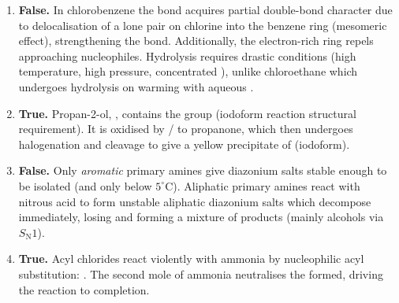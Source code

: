 \documentclass[11pt]{article}
\newcommand{\cle}[1]{{\popxbold\color{popdark}#1}}
\begin{document}
\begin{corrige}
\begin{enumerate}
\item \textbf{False.} In chlorobenzene the  bond acquires partial double-bond character due to delocalisation of a lone pair on chlorine into the benzene ring (\cle{mesomeric effect}), strengthening the bond. Additionally, the electron-rich ring repels approaching nucleophiles. Hydrolysis requires drastic conditions (high temperature, high pressure, concentrated ), unlike chloroethane which undergoes hydrolysis on warming with aqueous .
\item \textbf{True.} Propan-2-ol, , contains the  group (\cle{iodoform reaction} structural requirement). It is oxidised by / to propanone, which then undergoes halogenation and cleavage to give a yellow precipitate of  (iodoform).
\item \textbf{False.} Only \emph{aromatic} primary amines give diazonium salts stable enough to be isolated (and only below $5^{\circ}\mathrm{C}$). Aliphatic primary amines react with nitrous acid to form unstable aliphatic diazonium salts which decompose immediately, losing  and forming a mixture of products (mainly alcohols via $S_{\mathrm{N}}1$).
\item \textbf{True.} Acyl chlorides react violently with ammonia by nucleophilic acyl substitution: . The second mole of ammonia neutralises the  formed, driving the reaction to completion.
\end{enumerate}
\end{corrige}
\end{document}
